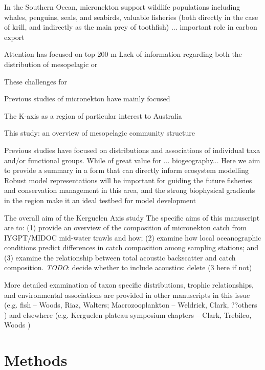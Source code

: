 \documentclass[12pt]{article}
\begin{document}
{In the Southern Ocean, micronekton support wildlife populations including whales, penguins, seals, and seabirds, valuable fisheries (both directly in the case of krill, and indirectly as the main prey of toothfish) ... important role in carbon export

Attention has focused on top 200 m
Lack of information regarding both the distribution of mesopelagic or

These challenges for 

Previous studies of micronekton have mainly focused

The 
K-axis as a region of particular interest to Australia

This study: an overview of mesopelagic community structure

Previous studies have focused on distributions and associations of individual taxa and/or functional groups. 
While of great value for ... biogeography... 
Here we aim to provide a summary in a form that can directly inform ecosystem modelling 
Robust model representations will be important for guiding the future fisheries and conservation management in this area, and the strong biophysical gradients in the region make it an ideal testbed for model development

The overall aim of the Kerguelen Axis study
The specific aims of this manuscript are to: 
	(1) provide an overview of the composition of micronekton catch from IYGPT/MIDOC mid-water trawls and how;
	(2) examine how local oceanographic conditions predict differences in catch composition among sampling stations; and
	(3) examine the relationship between total acoustic backscatter and catch composition.
\emph{TODO}: decide whether to include acoustics: delete (3 here if not)


More detailed examination of taxon specific distributions, trophic relationships, and environmental associations are provided in other manuscripts in this issue (e.g.
fish -- Woods, Riaz, Walters;  
Macrozooplankton -- Weldrick, Clark, ??others
)
and elsewhere (e.g.
Kerguelen plateau symposium chapters -- Clark, Trebilco, Woods
)


\section{Methods}



}
\end{document}
